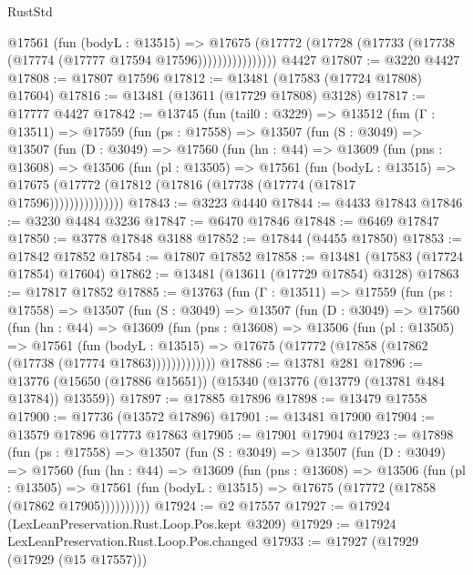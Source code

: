 \begin{lexlean}{RustStd}
\begin{coremodule}
                    @17561
                      (fun (bodyL : @13515) =>
                      @17675
                        (@17772
                          (@17728 (@17733 (@17738 (@17774 (@17777 @17594 @17596))))))))))))))))
    @4427
@17807 := @3220 @4427
@17808 := @17807 @17596
@17812 := @13481 (@17583 (@17724 @17808) @17604)
@17816 := @13481 (@13611 (@17729 @17808) @3128)
@17817 := @17777 @4427
@17842 := @13745
    (fun (tail0 : @3229) =>
    @13512
      (fun (Γ : @13511) =>
      @17559
        (fun (ps : @17558) =>
        @13507
          (fun (S : @3049) =>
          @13507
            (fun (D : @3049) =>
            @17560
              (fun (hn : @44) =>
              @13609
                (fun (pns : @13608) =>
                @13506
                  (fun (pl : @13505) =>
                  @17561
                    (fun (bodyL : @13515) =>
                    @17675 (@17772 (@17812 (@17816 (@17738 (@17774 (@17817 @17596)))))))))))))))
@17843 := @3223 @4440
@17844 := @4433 @17843
@17846 := @3230 @4484 @3236
@17847 := @6470 @17846
@17848 := @6469 @17847
@17850 := @3778 @17848 @3188
@17852 := @17844 (@4455 @17850)
@17853 := @17842 @17852
@17854 := @17807 @17852
@17858 := @13481 (@17583 (@17724 @17854) @17604)
@17862 := @13481 (@13611 (@17729 @17854) @3128)
@17863 := @17817 @17852
@17885 := @13763
    (fun (Γ : @13511) =>
    @17559
      (fun (ps : @17558) =>
      @13507
        (fun (S : @3049) =>
        @13507
          (fun (D : @3049) =>
          @17560
            (fun (hn : @44) =>
            @13609
              (fun (pns : @13608) =>
              @13506
                (fun (pl : @13505) =>
                @17561
                  (fun (bodyL : @13515) =>
                  @17675 (@17772 (@17858 (@17862 (@17738 (@17774 @17863)))))))))))))
@17886 := @13781 @281
@17896 := @13776 (@15650 (@17886 @15651)) (@15340 (@13776 (@13779 (@13781 @484 @13784)) @13559))
@17897 := @17885 @17896
@17898 := @13479 @17558
@17900 := @17736 (@13572 @17896)
@17901 := @13481 @17900
@17904 := @13579 @17896 @17773 @17863
@17905 := @17901 @17904
@17923 := @17898
    (fun (ps : @17558) =>
    @13507
      (fun (S : @3049) =>
      @13507
        (fun (D : @3049) =>
        @17560
          (fun (hn : @44) =>
          @13609
            (fun (pns : @13608) =>
            @13506
              (fun (pl : @13505) =>
              @17561 (fun (bodyL : @13515) => @17675 (@17772 (@17858 (@17862 @17905))))))))))
@17924 := @2 @17557
@17927 := @17924 (LexLeanPreservation.Rust.Loop.Pos.kept @3209)
@17929 := @17924 LexLeanPreservation.Rust.Loop.Pos.changed
@17933 := @17927 (@17929 (@17929 (@15 @17557)))

\end{coremodule}
\end{lexlean}

